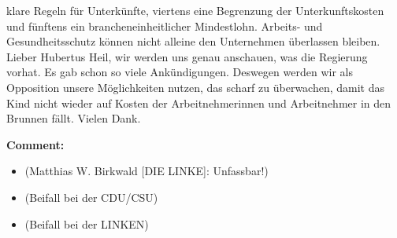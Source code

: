 \documentclass{article}
\begin{document}
klare Regeln für Unterkünfte, viertens eine Begrenzung der Unterkunftskosten und fünftens ein brancheneinheitlicher Mindestlohn.  Arbeits- und Gesundheitsschutz können nicht alleine den Unternehmen überlassen bleiben. Lieber Hubertus Heil, wir werden uns genau anschauen, was die Regierung vorhat. Es gab schon so viele Ankündigungen. Deswegen werden wir als Opposition unsere Möglichkeiten nutzen, das scharf zu überwachen, damit das Kind nicht wieder auf Kosten der Arbeitnehmerinnen und Arbeitnehmer in den Brunnen fällt. Vielen Dank.  

\noindent\textbf{Comment:}
\begin{itemize}
    \setlength\itemsep{-3pt}
    \item (Matthias W. Birkwald [DIE LINKE]: Unfassbar!)
    \setlength\itemsep{-3pt}
    \item (Beifall bei der CDU/CSU)
    \setlength\itemsep{-3pt}
    \item (Beifall bei der LINKEN)
\end{itemize}
\end{document}

